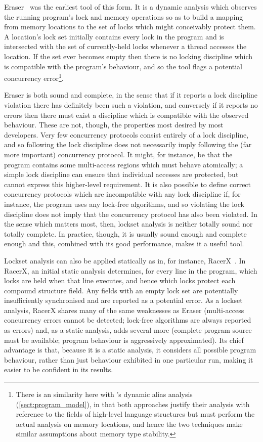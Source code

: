 Eraser~\cite{Savage1997} was the earliest tool of this form.  It is a
dynamic analysis which observes the running program's lock and memory
operations so as to build a mapping from memory locations to the set
of locks which might conceivably protect them.  A location's lock set
initially contains every lock in the program and is intersected with
the set of currently-held locks whenever a thread accesses the
location.  If the set ever becomes empty then there is no locking
discipline which is compatible with the program's behaviour, and so
the tool flags a potential concurrency error\footnote{There is an
  similarity here with {\technique}'s dynamic alias analysis
  (\autoref{sect:program_model}), in that both approaches justify
  their analysis with reference to the fields of high-level language
  structures but must perform the actual analysis on memory locations,
  and hence the two techniques make similar assumptions about memory
  type stability.}.

Eraser is both sound and complete, in the sense that if it reports a
lock discipline violation there has definitely been such a violation,
and conversely if it reports no errors then there must exist a
discipline which is compatible with the observed behaviour.  These are
not, though, the properties most desired by most developers.  Very few
concurrency protocols consist entirely of a lock discipline, and so
following the lock discipline does not necessarily imply following the
(far more important) concurrency protocol.  It might, for instance, be
that the program contains some multi-access regions which must behave
atomically; a simple lock discipline can ensure that individual
accesses are protected, but cannot express this higher-level
requirement.  It is also possible to define correct concurrency
protocols which are incompatible with any lock discipline if, for
instance, the program uses any lock-free algorithms, and so violating
the lock discipline does not imply that the concurrency protocol has
also been violated.  In the sense which matters most, then, lockset
analysis is neither totally sound nor totally complete.  In practice,
though, it is usually sound enough and complete enough and this,
combined with its good performance, makes it a useful tool.

Lockset analysis can also be applied statically as in, for instance,
RacerX~\cite{Engler2003}.  In RacerX, an initial static analysis
determines, for every line in the program, which locks are held when
that line executes, and hence which locks protect each compound
structure field.  Any fields with an empty lock set are potentially
insufficiently synchronised and are reported as a potential error.  As
a lockset analysis, RacerX shares many of the same weaknesses as
Eraser (multi-access concurrency errors cannot be detected; lock-free
algorithms are always reported as errors) and, as a static analysis,
adds several more (complete program source must be available; program
behaviour is aggressively approximated).  Its chief advantage is that,
because it is a static analysis, it considers all possible program
behaviour, rather than just behaviour exhibited in one particular run,
making it easier to be confident in its results.

